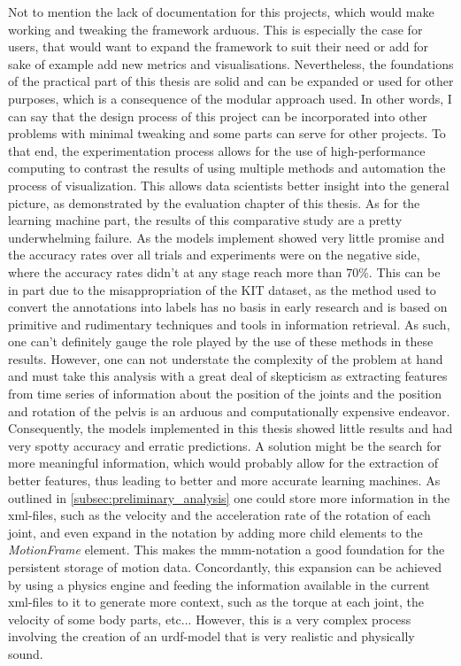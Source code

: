 Not to mention the lack of documentation for this projects, which would make working and tweaking the framework arduous. This is especially the case for users, that would want to expand the framework to suit their need or add for sake of example add new metrics and visualisations.\newline
Nevertheless, the foundations of the practical part of this thesis are solid and can be expanded or used for other purposes, which is a consequence of the modular approach used. In other words, I can say that the design process of this project can be incorporated into other problems with minimal tweaking and some parts can serve for other projects. To that end, the experimentation process allows for the use of high-performance computing to contrast the results of using multiple methods and automation the process of visualization. This allows data scientists better insight into the general picture, as demonstrated by the evaluation chapter of this thesis.\newline
As for the learning machine part, the results of this comparative study are a pretty underwhelming failure. As the models implement showed very little promise and the accuracy rates over all trials and experiments were on the negative side, where the accuracy rates didn't at any stage reach more than 70\%. This can be in part due to the misappropriation of the KIT dataset, as the method used to convert the annotations into labels has no basis in early research and is based on primitive and rudimentary techniques and tools in information retrieval. As such, one can't definitely gauge the role played by the use of these methods in these results. However, one can not understate the complexity of the problem at hand and must take this analysis with a great deal of skepticism as extracting features from time series of information about the position of the joints and the position and rotation of the pelvis is an arduous and computationally expensive endeavor. Consequently, the models implemented in this thesis showed little results and had very spotty accuracy and erratic predictions.\newline
A solution might be the search for more meaningful information, which would probably allow for the extraction of better features, thus leading to better and more accurate learning machines. As outlined in \ref{subsec:preliminary_analysis} one could store more information in the xml-files, such as the velocity and the acceleration rate of the rotation of each joint, and even expand in the notation by adding more child elements to the \textit{MotionFrame} element. This makes the mmm-notation a good foundation for the persistent storage of motion data. Concordantly, this expansion can be achieved by using a physics engine and feeding the information available in the current xml-files to it to generate more context, such as the torque at each joint, the velocity of some body parts, etc... However, this is a very complex process involving the creation of an urdf-model that is very realistic and physically sound.\newline
